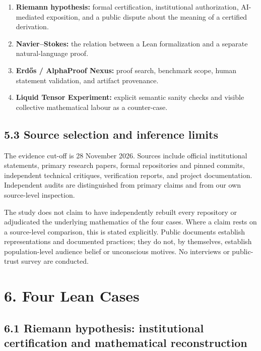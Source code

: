 \documentclass[sn-apa]{sn-jnl}
\begin{document}
\begin{enumerate}

\item \textbf{Riemann hypothesis:} formal certification, institutional authorization, AI-mediated exposition, and a public dispute about the meaning of a certified derivation.

\item \textbf{Navier–Stokes:} the relation between a Lean formalization and a separate natural-language proof.

\item \textbf{Erdős / AlphaProof Nexus:} proof search, benchmark scope, human statement validation, and artifact provenance.

\item \textbf{Liquid Tensor Experiment:} explicit semantic sanity checks and visible collective mathematical labour as a counter-case.

\end{enumerate}

\subsection{5.3 Source selection and inference limits}

The evidence cut-off is 28 November 2026. Sources include official institutional statements, primary research papers, formal repositories and pinned commits, independent technical critiques, verification reports, and project documentation. Independent audits are distinguished from primary claims and from our own source-level inspection.

The study does not claim to have independently rebuilt every repository or adjudicated the underlying mathematics of the four cases. Where a claim rests on a source-level comparison, this is stated explicitly. Public documents establish representations and documented practices; they do not, by themselves, establish population-level audience belief or unconscious motives. No interviews or public-trust survey are conducted.

\section{6. Four Lean Cases}

\subsection{6.1 Riemann hypothesis: institutional certification and mathematical reconstruction}
\end{document}
